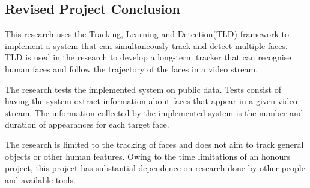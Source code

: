 \subsection{Revised Project Conclusion}
This research uses the Tracking, Learning and Detection(TLD) framework to implement a system that can simultaneously track and detect multiple faces.
TLD is used in the research to develop a long-term tracker that can recognise human faces and follow the trajectory of the faces in a video stream.

The research tests the implemented system on public data.
Tests consist of having the system extract information about faces that appear in a given video stream.
The information collected by the implemented system is the number and duration of appearances for each target face. 

The research is limited to the tracking of faces and does not aim to track general objects or other human features.
Owing to the time limitations of an honours project, this project has substantial dependence on research done by other people and available tools.
